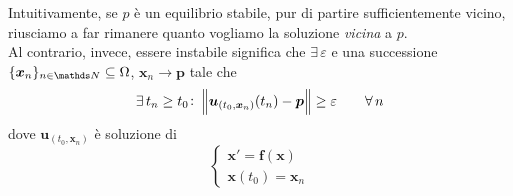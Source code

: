 Intuitivamente, se $p$ è un equilibrio stabile, pur di partire sufficientemente vicino, riusciamo a far rimanere quanto vogliamo la soluzione \textit{vicina} a $p$.\\
Al contrario, invece, essere instabile significa che $ \exists\, \varepsilon $ e una successione $ \{\bm{x}_{n} \}_{n \in \N} \subseteq \Omega $, $ \bm{x}_{n} \to \bm{p} $ tale che \[
        \exists\, t_{n}\ge t_0\colon \left\lVert\bm{u}_{(t_0,\bm{x}_n)}(t_{n} )-\bm{p}\right\rVert\ge \varepsilon \quad \quad \forall\, n
    \]dove $ \bm{u}_{(t_0,\bm{x}_n)} $ è soluzione di \[
        \begin{cases}
            \bm{x}'=\bm{f}(\bm{x})\\ 
            \bm{x}(t_0)=\bm{x}_n
        \end{cases}
    \]

